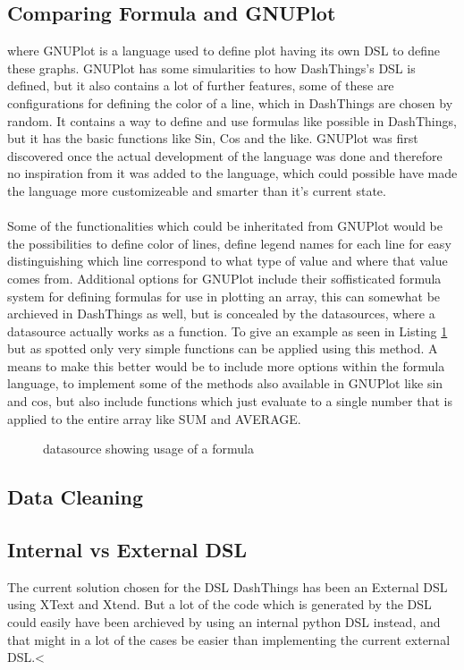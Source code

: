 \subsection{Comparing Formula and GNUPlot} where GNUPlot is a language used to define
plot having its own DSL to define these graphs. GNUPlot has some simularities to how DashThings's
DSL is defined, but it also contains a lot of further features, some of these are configurations
for defining the color of a line, which in DashThings are chosen by random. It contains a way
to define and use formulas like possible in DashThings, but it has the basic functions like
Sin, Cos and the like. GNUPlot was first discovered once the actual development of the language
was done and therefore no inspiration from it was added to the language, which could possible have
made the language more customizeable and smarter than it's current state.
\\
\\
Some of the functionalities which could be inheritated from GNUPlot would be the possibilities to
define color of lines, define legend names for each line for easy distinguishing which line
correspond to what type of value and where that value comes from. Additional options for GNUPlot
include their soffisticated formula system for defining formulas for use in plotting an array,
this can somewhat be archieved in DashThings as well, but is concealed by the datasources, where
a datasource actually works as a function. To give an example as seen in Listing
\ref{lst:datasource-formula} but as spotted only very simple functions can be applied using
this method. A means to make this better would be to include more options within the formula
language, to implement some of the methods also available in GNUPlot like sin and cos, but also
include functions which just evaluate to a single number that is applied to the entire array
like SUM and AVERAGE.

\begin{figure}
  \caption{datasource showing usage of a formula}
  \label{lst:datasource-formula}
  
\end{figure}

\subsection{Data Cleaning}

\subsection{Internal vs External DSL} The current solution chosen for the DSL DashThings has
been an External DSL using XText and Xtend. But a lot of the code which is generated by the DSL
could easily have been archieved by using an internal python DSL instead, and that might in a lot
of the cases be easier than implementing the current external DSL.<
 